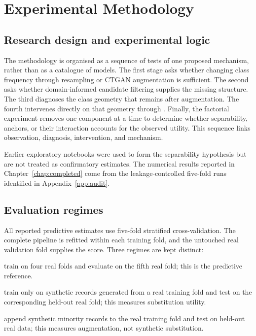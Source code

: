 \chapter{Experimental Methodology}
\label{chap:methodology}

\section{Research design and experimental logic}

The methodology is organised as a sequence of tests of one proposed mechanism, rather than as a catalogue of models. The first stage asks whether changing class frequency through resampling or CTGAN augmentation is sufficient. The second asks whether domain-informed candidate filtering supplies the missing structure. The third diagnoses the class geometry that remains after augmentation. The fourth intervenes directly on that geometry through \sepa{}. Finally, the factorial experiment removes one component at a time to determine whether separability, anchors, or their interaction accounts for the observed utility. This sequence links observation, diagnosis, intervention, and mechanism.

Earlier exploratory notebooks were used to form the separability hypothesis but are not treated as confirmatory estimates. The numerical results reported in Chapter~\ref{chap:completed} come from the leakage-controlled five-fold runs identified in Appendix~\ref{app:audit}.

\section{Evaluation regimes}

All reported predictive estimates use five-fold stratified cross-validation. The complete pipeline is refitted within each training fold, and the untouched real validation fold supplies the score. Three regimes are kept distinct:
\begin{description}[leftmargin=3.4cm,style=nextline]
\item[\ra{} (TRTR)] train on four real folds and evaluate on the fifth real fold; this is the predictive reference.
\item[\sr{} (TSTR)] train only on synthetic records generated from a real training fold and test on the corresponding held-out real fold; this measures substitution utility.
\item[\rsr{}] append synthetic minority records to the real training fold and test on held-out real data; this measures augmentation, not synthetic substitution.
\end{description}


